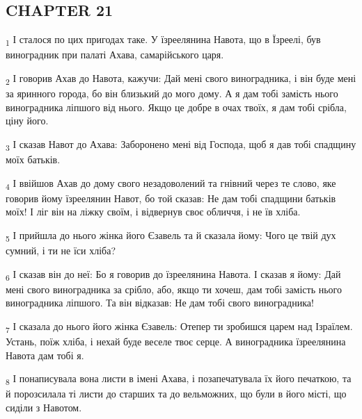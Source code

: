 \subsection{CHAPTER 21}
\begin{tcolorbox}
\textsubscript{1} І сталося по цих пригодах таке. У їзреелянина Навота, що в Їзреелі, був виноградник при палаті Ахава, самарійського царя.
\end{tcolorbox}
\begin{tcolorbox}
\textsubscript{2} І говорив Ахав до Навота, кажучи: Дай мені свого виноградника, і він буде мені за яринного города, бо він близький до мого дому. А я дам тобі замість нього виноградника ліпшого від нього. Якщо це добре в очах твоїх, я дам тобі срібла, ціну його.
\end{tcolorbox}
\begin{tcolorbox}
\textsubscript{3} І сказав Навот до Ахава: Заборонено мені від Господа, щоб я дав тобі спадщину моїх батьків.
\end{tcolorbox}
\begin{tcolorbox}
\textsubscript{4} І ввійшов Ахав до дому свого незадоволений та гнівний через те слово, яке говорив йому їзреелянин Навот, бо той сказав: Не дам тобі спадщини батьків моїх! І ліг він на ліжку своїм, і відвернув своє обличчя, і не їв хліба.
\end{tcolorbox}
\begin{tcolorbox}
\textsubscript{5} І прийшла до нього жінка його Єзавель та й сказала йому: Чого це твій дух сумний, і ти не їси хліба?
\end{tcolorbox}
\begin{tcolorbox}
\textsubscript{6} І сказав він до неї: Бо я говорив до їзреелянина Навота. І сказав я йому: Дай мені свого виноградника за срібло, або, якщо ти хочеш, дам тобі замість нього виноградника ліпшого. Та він відказав: Не дам тобі свого виноградника!
\end{tcolorbox}
\begin{tcolorbox}
\textsubscript{7} І сказала до нього його жінка Єзавель: Отепер ти зробишся царем над Ізраїлем. Устань, поїж хліба, і нехай буде веселе твоє серце. А виноградника їзреелянина Навота дам тобі я.
\end{tcolorbox}
\begin{tcolorbox}
\textsubscript{8} І понаписувала вона листи в імені Ахава, і позапечатувала їх його печаткою, та й порозсилала ті листи до старших та до вельможних, що були в його місті, що сиділи з Навотом.
\end{tcolorbox}
